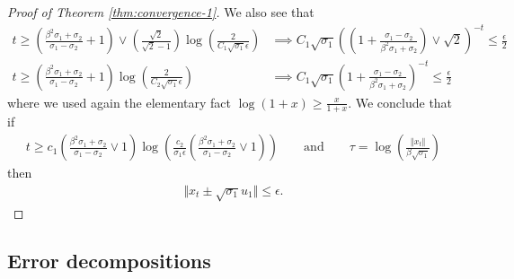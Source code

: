 \begin{proof}[Proof of Theorem \ref{thm:convergence-1}]
    We also see that 
    \begin{align}
        t \ge  \left(\frac{\beta^2 \sigma_1 + \sigma_2}{\sigma_1 - \sigma_2 } + 1\right)\vee \left( \frac{\sqrt{2}}{\sqrt{2}-1}\right) \log\left( \frac{2}{C_1 \sqrt{\sigma_1} \epsilon }  \right) & \implies C_1  \sqrt{\sigma_1}   \left( \left(1 + \frac{\sigma_1 - \sigma_2 }{\beta^2 \sigma_1 + \sigma_2}\right) \vee \sqrt{2}  \right)^{-t} \le \frac{\epsilon}{2} \label{eq:condition 2}  \\
        t \ge  \left(\frac{\beta^2 \sigma_1 + \sigma_2}{\sigma_1 - \sigma_2 } + 1\right) \log\left( \frac{2}{C_2 \sqrt{\sigma_1} \epsilon }  \right) & \implies C_1  \sqrt{\sigma_1}    \left(1 + \frac{\sigma_1 - \sigma_2 }{\beta^2 \sigma_1 + \sigma_2}  \right)^{-t} \le \frac{\epsilon}{2} \label{eq:condition 3} 
    \end{align}
    where we used again the elementary fact $\log(1 + x) \ge \frac{x}{1 + x}$. We conclude that if 
    \begin{align*}
        t \ge c_1 \left( \frac{\beta^2 \sigma_1 + \sigma_2}{\sigma_1 - \sigma_2} \vee 1\right) \log\left( \frac{c_2}{\sigma_1 \epsilon} \left( \frac{\beta^2 \sigma_1 + \sigma_2}{\sigma_1 - \sigma_2} \vee 1\right)\right) \qquad \text{and} \qquad \tau  =  \log\left( \frac{\Vert x_t \Vert}{\beta \sqrt{\sigma_1}}\right)
    \end{align*}
    then 
    \begin{align*}
        \Vert x_t \pm \sqrt{\sigma_1} u_1 \Vert \le \epsilon. 
    \end{align*}
\end{proof}




\subsection{Error decompositions}

